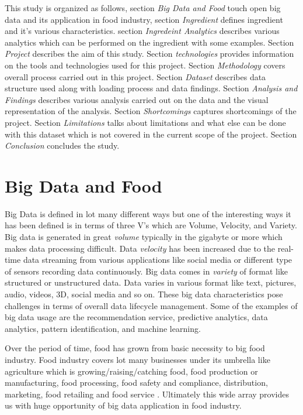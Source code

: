 \documentclass[sigconf]{acmart}
\begin{document}
This study is organized as follows, section \emph{Big Data and Food} touch open big data and its application in food industry, section \emph{Ingredient} defines ingredient and it's various characteristics. section \emph{Ingredeint Analytics} describes various analytics which can be performed on the ingredient with some examples. Section \emph{Project} describes the aim of this study. Section \emph{technologies} provides information on the tools and technologies used for this project. Section \emph{Methodology} covers overall process carried out in this project. Section \emph{Dataset} describes data structure used along with loading process and data findings. Section \emph{Analysis and Findings} describes various analysis carried out on the data and the visual representation of the analysis. Section \emph{Shortcomings} captures shortcomings of the project. Section \emph{Limitations} talks about limitations and what else can be done with this dataset which is not covered in the current scope of the project. Section \emph{Conclusion} concludes the study.  

\section{Big Data and Food}
Big Data is defined in lot many different ways but one of the interesting ways it has been defined is in terms of three V's which are Volume, Velocity, and Variety. Big data is generated in great \emph{volume} typically in the gigabyte or more which makes data processing difficult. Data \emph{velocity} has been increased due to the real-time data streaming from various applications like social media or different type of sensors recording data continuously. Big data comes in \emph{variety} of format like structured or unstructured data. Data varies in various format like text, pictures, audio, videos, 3D, social media and so on. These big data characteristics pose challenges in terms of overall data lifecycle management. Some of the examples of big data usage are the recommendation service, predictive analytics, data analytics, pattern identification, and machine learning.

Over the period of time, food has grown from basic necessity to big food industry. Food industry covers lot many businesses under its umbrella like agriculture which is growing/raising/catching food, food production or manufacturing, food processing, food safety and compliance, distribution, marketing, food retailing and food service \cite{www-foodind}. Ultimately this wide array provides us with huge opportunity of big data application in food industry.
\end{document}
